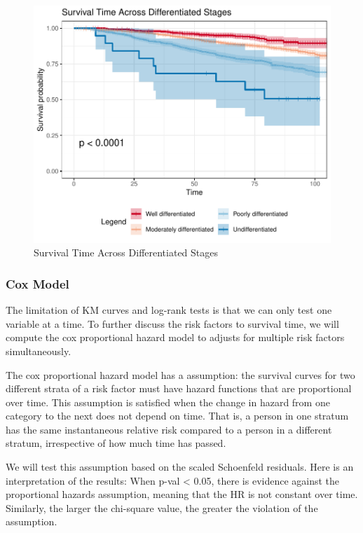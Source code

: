 \documentclass[
]{article}
\begin{document}
\begin{figure}
\includegraphics[width=0.9\linewidth]{Appendix_files/figure-latex/log_rank-1} \caption{Survival Time Across Differentiated Stages}\label{fig:log_rank}
\end{figure}

\newpage

\subsubsection{Cox Model}\label{cox-model}

The limitation of KM curves and log-rank tests is that we can only test
one variable at a time. To further discuss the risk factors to survival
time, we will compute the cox proportional hazard model to adjusts for
multiple risk factors simultaneously.

The cox proportional hazard model has a assumption: the survival curves
for two different strata of a risk factor must have hazard functions
that are proportional over time. This assumption is satisfied when the
change in hazard from one category to the next does not depend on time.
That is, a person in one stratum has the same instantaneous relative
risk compared to a person in a different stratum, irrespective of how
much time has passed.

We will test this assumption based on the scaled Schoenfeld residuals.
Here is an interpretation of the results: When p-val \textless{} 0.05,
there is evidence against the proportional hazards assumption, meaning
that the HR is not constant over time. Similarly, the larger the
chi-square value, the greater the violation of the assumption.
\end{document}
